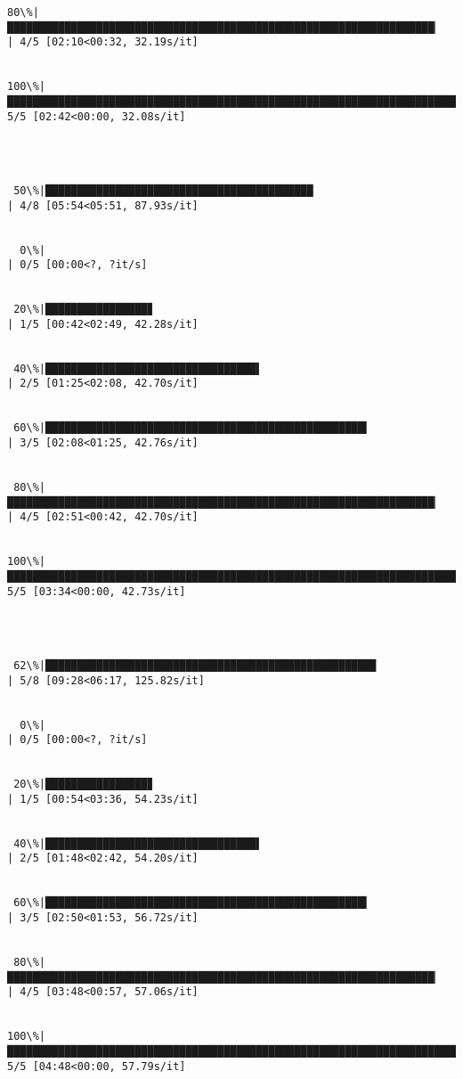 \documentclass[11pt]{article}
\begin{document}
\begin{Verbatim}[commandchars=\\\{\}]
 80\%|███████████████████████████████████████████████████████████████████▏                | 4/5 [02:10<00:32, 32.19s/it]


100\%|████████████████████████████████████████████████████████████████████████████████████| 5/5 [02:42<00:00, 32.08s/it]




 50\%|██████████████████████████████████████████                                          | 4/8 [05:54<05:51, 87.93s/it]


  0\%|                                                                                            | 0/5 [00:00<?, ?it/s]


 20\%|████████████████▊                                                                   | 1/5 [00:42<02:49, 42.28s/it]


 40\%|█████████████████████████████████▌                                                  | 2/5 [01:25<02:08, 42.70s/it]


 60\%|██████████████████████████████████████████████████▍                                 | 3/5 [02:08<01:25, 42.76s/it]


 80\%|███████████████████████████████████████████████████████████████████▏                | 4/5 [02:51<00:42, 42.70s/it]


100\%|████████████████████████████████████████████████████████████████████████████████████| 5/5 [03:34<00:00, 42.73s/it]




 62\%|███████████████████████████████████████████████████▉                               | 5/8 [09:28<06:17, 125.82s/it]


  0\%|                                                                                            | 0/5 [00:00<?, ?it/s]


 20\%|████████████████▊                                                                   | 1/5 [00:54<03:36, 54.23s/it]


 40\%|█████████████████████████████████▌                                                  | 2/5 [01:48<02:42, 54.20s/it]


 60\%|██████████████████████████████████████████████████▍                                 | 3/5 [02:50<01:53, 56.72s/it]


 80\%|███████████████████████████████████████████████████████████████████▏                | 4/5 [03:48<00:57, 57.06s/it]


100\%|████████████████████████████████████████████████████████████████████████████████████| 5/5 [04:48<00:00, 57.79s/it]





\end{Verbatim}
\end{document}
